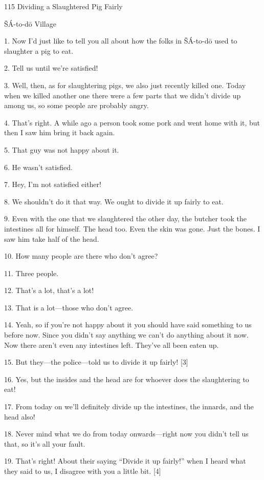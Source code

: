 
{115 Dividing a Slaughtered Pig Fairly}

{ŠÁ-to-dō Village}

{1. Now I'd just like to tell you all about how the folks in ŠÁ-to-dō
used to slaughter a pig to eat.}

{2. Tell us until we're satisfied!}

{3. Well, then, as for slaughtering pigs, we also just recently killed one.
Today when we killed another one there were a few parts that we didn't divide up
among us, so some people are probably angry.}

{4. That's right. A while ago a person took some pork and went home with
it, but then I saw him bring it back again.}

{5. That guy was not happy about it.}

{6. He wasn't satisfied.}

{7. Hey, I'm not satisfied either!}

{8. We shouldn't do it that way. We ought to divide it up fairly to eat.}

{9. Even with the one that we slaughtered the other day, the butcher took
the intestines all for himself. The head too. Even the skin was gone. Just the
bones. I saw him take half of the head.}

{10. How many people are there who don't agree?}

{11. Three people.}

{12. That's a lot, that's a lot!}

{13. That is a lot---those who don't agree.}

{14. Yeah, so if you're not happy about it you should have said something
to us before now. Since you didn't say anything we can't do anything about it now.
Now there aren't even any intestines left. They've all been eaten up.}

{15. But they---the police---told us to divide it up fairly! [3]}

{16. Yes, but the insides and the head are for whoever does the slaughtering
to eat!}

{17. From today on we'll definitely divide up the intestines, the innards,
and the head also!}

{18. Never mind what we do from today onwards---right now you didn't tell
us that, so it's all your fault.}

{19. That's right! About their saying ``Divide it up fairly!'' when I heard
what they said to us, I disagree with you a little bit. [4]}

